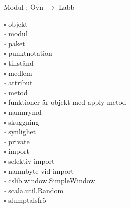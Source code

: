 
    Modul : Övn  $\rightarrow$ Labb 
    \begin{multicols}{3}\SlideFontTiny
    $\square$ objekt \\
$\square$ modul \\
$\square$ paket \\
$\square$ punktnotation \\
$\square$ tillstånd \\
$\square$ medlem \\
$\square$ attribut \\
$\square$ metod \\
$\square$ funktioner är objekt med apply-metod \\
$\square$ namnrymd \\
$\square$ skuggning \\
$\square$ synlighet \\
$\square$ private \\
$\square$ import \\
$\square$ selektiv import \\
$\square$ namnbyte vid import \\
$\square$ cslib.window.SimpleWindow \\
$\square$ scala.util.Random \\
$\square$ slumptalsfrö \\
    \end{multicols}
    